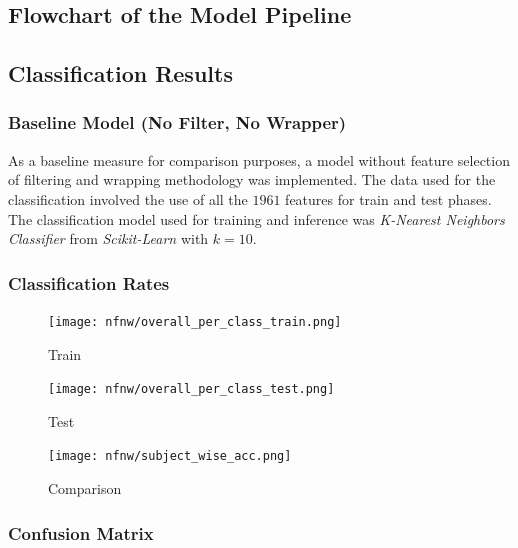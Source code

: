 \documentclass[12pt,twoside,a4paper]{article}
\begin{document}
\subsection{Flowchart of the Model Pipeline}



\subsection{Classification Results}

\subsubsection{Baseline Model (No Filter, No Wrapper)}
As a baseline measure for comparison purposes, a model without feature selection of filtering and wrapping methodology was implemented. The data used for the classification involved the use of all the $1961$ features for train and test phases. The classification model used for training and inference was \textit{K-Nearest Neighbors Classifier} from \textit{Scikit-Learn} with $k=10$.

\subsubsection*{Classification Rates}

\begin{figure}[H]
    \centering
    \texttt{[image: nfnw/overall\_per\_class\_train.png]}
    \caption{Train}
    \label{fig: NFW1}
\end{figure}

\begin{figure}[H]
    \centering
    \texttt{[image: nfnw/overall\_per\_class\_test.png]}
    \caption{Test}
    \label{fig: NFW2}
\end{figure}

\begin{figure}[H]
    \centering
    \texttt{[image: nfnw/subject\_wise\_acc.png]}
    \caption{Comparison}
    \label{fig: NFW3}
\end{figure}

\subsubsection*{Confusion Matrix}
\end{document}
